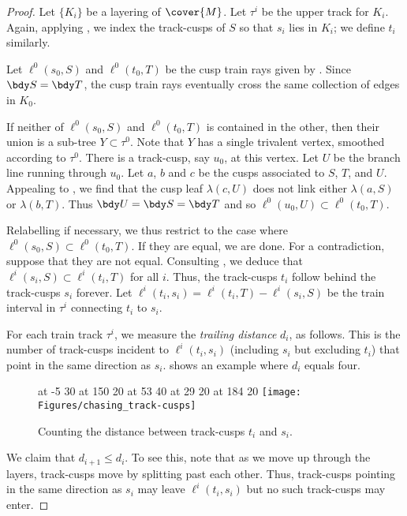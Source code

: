 \documentclass[12pt]{amsart}
\begin{document}
\begin{proof}
Let $\{K_i\}$ be a layering of $\cover{M}$.  Let $\tau^i$ be the upper track for $K_i$.  Again, applying , we index the track-cusps of $S$ so that $s_i$ lies in $K_i$; we define $t_i$ similarly.  

Let $\ell^0(s_0,S)$ and $\ell^0(t_0,T)$ be the cusp train rays given by . Since $\bdy S = \bdy T$, the cusp train rays eventually cross the same collection of edges in $K_0$.  

If neither of $\ell^0(s_0, S)$ and $\ell^0(t_0, T)$ is contained in the other, then their union is a sub-tree $Y \subset \tau^0$.  Note that $Y$ has a single trivalent vertex, smoothed according to $\tau^0$.  There is a track-cusp, say $u_0$, at this vertex. Let $U$ be the branch line running through $u_0$.  Let $a$, $b$ and $c$ be the cusps associated to $S$, $T$, and $U$.  Appealing to , we find that the cusp leaf $\lambda(c, U)$ does not link either $\lambda(a, S)$ or $\lambda(b, T)$.  Thus $\bdy U = \bdy S = \bdy T$ and so $\ell^0(u_0, U) \subset \ell^0(t_0, T)$. 

Relabelling if necessary, we thus restrict to the case where $\ell^0(s_0, S) \subset \ell^0(t_0, T)$.  If they are equal, we are done.  For a contradiction, suppose that they are not equal.  Consulting , we deduce that $\ell^i(s_i, S) \subset \ell^i(t_i, T)$ for all $i$.  Thus, the track-cusps $t_i$ follow behind the track-cusps $s_i$ forever.  Let  $\ell^i(t_i, s_i) = \ell^i(t_i, T) - \ell^i(s_i, S)$ be the train interval in $\tau^i$ connecting $t_i$ to $s_i$. 

For each train track $\tau^i$, we measure the \emph{trailing distance} $d_i$, as follows.  This is the number of track-cusps incident to $\ell^i(t_i, s_i)$ (including $s_i$ but excluding $t_i$) that point in the same direction as $s_i$.   shows an example where $d_i$ equals four. 

\begin{figure}[htbp]
\small\hair 2pt
 at -5 30
 at 150 20
 at 53 40
 at 29 20
 at 184 20
\endlabellist
\texttt{[image: Figures/chasing\_track-cusps]}
\caption{Counting the distance between track-cusps $t_i$ and $s_i$.}
\label{Fig:ChasingTrackCusps}
\end{figure}

We claim that $d_{i+1} \leq d_i$. To see this, note that as we move up through the layers, track-cusps move by splitting past each other.  Thus, track-cusps pointing in the same direction as $s_i$ may leave $\ell^i(t_i, s_i)$ but no such track-cusps may enter. 


\end{proof}
\end{document}
